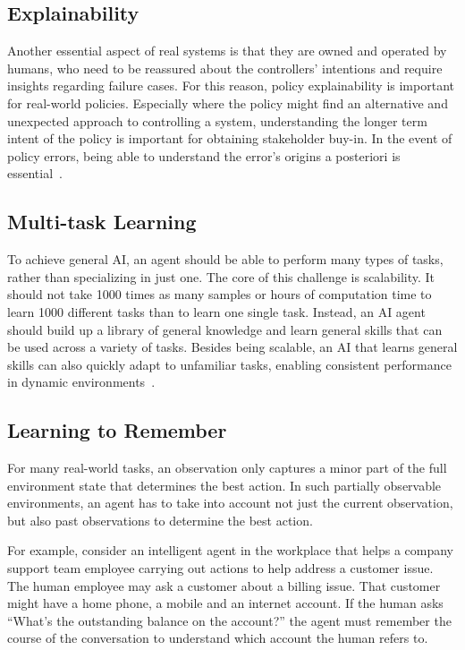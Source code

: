 \documentclass[letterpaper, 10 pt]{IEEEconf}
\begin{document}
\subsection{Explainability}

Another essential aspect of real systems is that they are owned and
operated by humans, who need to be reassured about the controllers’
intentions and require insights regarding failure cases. For this
reason, policy explainability is important for real-world
policies. Especially where the policy might find an alternative and
unexpected approach to controlling a system, understanding the longer
term intent of the policy is important for obtaining stakeholder
buy-in. In the event of policy errors, being able to understand the
error’s origins a posteriori is essential~\cite{deepmind2019}.

\subsection{Multi-task Learning}

To achieve general AI, an agent should be able to perform many types
of tasks, rather than specializing in just one. The core of this
challenge is scalability. It should not take 1000 times as many
samples or hours of computation time to learn 1000 different tasks
than to learn one single task. Instead, an AI agent should build up a
library of general knowledge and learn general skills that can be used
across a variety of tasks. Besides being scalable, an AI that learns
general skills can also quickly adapt to unfamiliar tasks, enabling
consistent performance in dynamic
environments~\cite{microsoft_research_2018}.

\subsection{Learning to Remember}

For many real-world tasks, an observation only captures a minor part
of the full environment state that determines the best action. In such
partially observable environments, an agent has to take into account
not just the current observation, but also past observations to
determine the best action.

For example, consider an intelligent agent in the workplace that helps
a company support team employee carrying out actions to help address a
customer issue. The human employee may ask a customer about a billing
issue. That customer might have a home phone, a mobile and an internet
account. If the human asks “What’s the outstanding balance on the
account?” the agent must remember the course of the conversation to
understand which account the human refers to.
\end{document}
